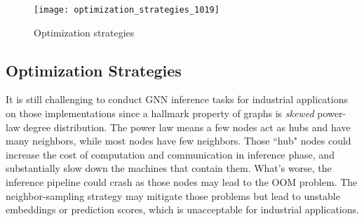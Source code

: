\documentclass[conference]{IEEEtran}
\begin{document}


\begin{figure*}[htbp]
\centering
\texttt{[image: optimization\_strategies\_1019]}
\caption{Optimization strategies}
\label{fig:optimization}
\end{figure*}

\subsection{Optimization Strategies}
\label{sec_opt_stategies}
It is still challenging to conduct GNN inference tasks for industrial applications on those implementations since a hallmark property of graphs is \emph{skewed} power-law degree distribution\cite{b17,b19}.
The power law means a few nodes act as hubs and have many neighbors, while most nodes have few neighbors.
Those ``hub" nodes could increase the cost of computation and communication in inference phase, and substantially slow down the machines that contain them.
What's worse, the inference pipeline could crash as those nodes may lead to the OOM problem.
The neighbor-sampling strategy\cite{b4} may mitigate those problems but lead to unstable embeddings or prediction scores, which is unacceptable for industrial applications. 
\end{document}
